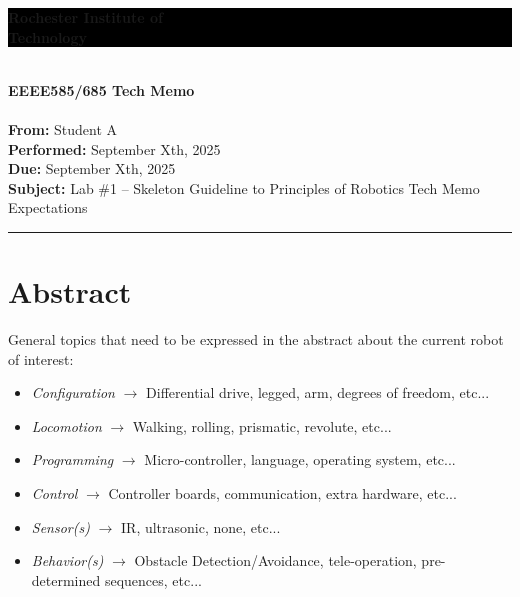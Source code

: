 \documentclass[12pt]{article}
\begin{document}
\noindent
\setlength{\fboxsep}{10pt}
\hspace*{\fill} 
\colorbox{black}{\parbox{0.35\linewidth}{\color{white}\textbf{Rochester Institute of\\ Technology}}}\\

\noindent
{\huge \textbf{EEEE585/685 Tech Memo}} \\
\vspace{6pt} \\
\textbf{From:} Student A \\
\textbf{Performed:} September Xth, 2025 \\
\textbf{Due:} September Xth, 2025 \\
\textbf{Subject:} Lab \#1 – Skeleton Guideline to Principles of Robotics Tech Memo Expectations

\noindent
\rule{\textwidth}{0.4pt}

\section*{Abstract}
General topics that need to be expressed in the abstract about the current robot of interest:
\begin{itemize}
    \item \textit{Configuration} $\rightarrow$ Differential drive, legged, arm, degrees of freedom, etc...
    \item \textit{Locomotion} $\rightarrow$ Walking, rolling, prismatic, revolute, etc...
    \item \textit{Programming} $\rightarrow$ Micro-controller, language, operating system, etc...
    \item \textit{Control} $\rightarrow$ Controller boards, communication, extra hardware, etc...
    \item \textit{Sensor(s)} $\rightarrow$ IR, ultrasonic, none, etc...
    \item \textit{Behavior(s)} $\rightarrow$ Obstacle Detection/Avoidance, tele-operation, pre-determined sequences, etc...
\end{itemize}
\end{document}
